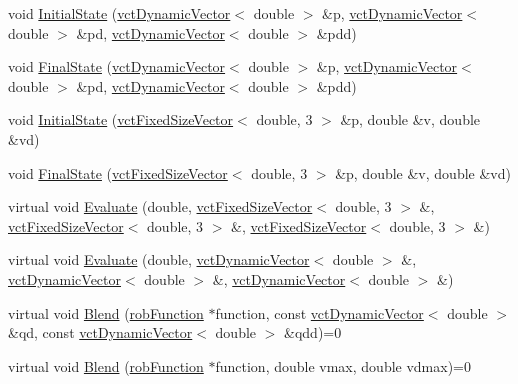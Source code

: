 \begin{DoxyCompactItemize}
\item 
void \hyperlink{classrob_function_rn_aa133ce3c6814498dbfc5388b069b4638}{Initial\-State} (\hyperlink{classvct_dynamic_vector}{vct\-Dynamic\-Vector}$<$ double $>$ \&p, \hyperlink{classvct_dynamic_vector}{vct\-Dynamic\-Vector}$<$ double $>$ \&pd, \hyperlink{classvct_dynamic_vector}{vct\-Dynamic\-Vector}$<$ double $>$ \&pdd)
\item 
void \hyperlink{classrob_function_rn_add7fc00dd53f1db63f16c40a46173537}{Final\-State} (\hyperlink{classvct_dynamic_vector}{vct\-Dynamic\-Vector}$<$ double $>$ \&p, \hyperlink{classvct_dynamic_vector}{vct\-Dynamic\-Vector}$<$ double $>$ \&pd, \hyperlink{classvct_dynamic_vector}{vct\-Dynamic\-Vector}$<$ double $>$ \&pdd)
\item 
void \hyperlink{classrob_function_rn_a381da91aa1d2879f7fdc63cef980bcb8}{Initial\-State} (\hyperlink{classvct_fixed_size_vector}{vct\-Fixed\-Size\-Vector}$<$ double, 3 $>$ \&p, double \&v, double \&vd)
\item 
void \hyperlink{classrob_function_rn_a4609f53c35aa374faada9243541cffca}{Final\-State} (\hyperlink{classvct_fixed_size_vector}{vct\-Fixed\-Size\-Vector}$<$ double, 3 $>$ \&p, double \&v, double \&vd)
\item 
virtual void \hyperlink{classrob_function_rn_a62b0cdb6474fb0ec9ae0e6ce286d3df0}{Evaluate} (double, \hyperlink{classvct_fixed_size_vector}{vct\-Fixed\-Size\-Vector}$<$ double, 3 $>$ \&, \hyperlink{classvct_fixed_size_vector}{vct\-Fixed\-Size\-Vector}$<$ double, 3 $>$ \&, \hyperlink{classvct_fixed_size_vector}{vct\-Fixed\-Size\-Vector}$<$ double, 3 $>$ \&)
\item 
virtual void \hyperlink{classrob_function_rn_a921fc7a6fb6e2ad96631964b7c691ad2}{Evaluate} (double, \hyperlink{classvct_dynamic_vector}{vct\-Dynamic\-Vector}$<$ double $>$ \&, \hyperlink{classvct_dynamic_vector}{vct\-Dynamic\-Vector}$<$ double $>$ \&, \hyperlink{classvct_dynamic_vector}{vct\-Dynamic\-Vector}$<$ double $>$ \&)
\item 
virtual void \hyperlink{classrob_function_rn_a199dc12ec208c84ef820257fa0c1679c}{Blend} (\hyperlink{classrob_function}{rob\-Function} $\ast$function, const \hyperlink{classvct_dynamic_vector}{vct\-Dynamic\-Vector}$<$ double $>$ \&qd, const \hyperlink{classvct_dynamic_vector}{vct\-Dynamic\-Vector}$<$ double $>$ \&qdd)=0
\item 
virtual void \hyperlink{classrob_function_rn_abb99f0170122c5554d3e336e8548c2a7}{Blend} (\hyperlink{classrob_function}{rob\-Function} $\ast$function, double vmax, double vdmax)=0
\end{DoxyCompactItemize}
